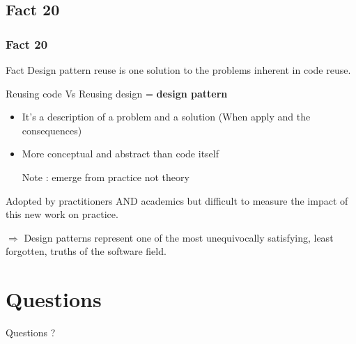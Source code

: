 \documentclass{beamer}
\begin{document}
\subsection{Fact 20}
\begin{frame}
    \frametitle{Fact 20}
    \begin{block}{Fact}
    Design pattern reuse is one solution to the problems inherent in code reuse.
    \end{block}

    Reusing code Vs Reusing design = \textbf{design pattern}

    \begin{itemize}
        \item It's a description of a problem and a solution
            (When apply and the consequences)
        \item More conceptual and abstract than code itself

        \item[Note]: emerge from practice not theory
    \end{itemize}

    Adopted by practitioners AND academics but difficult to measure the
    impact of this new work on practice.

    $\Rightarrow$  Design patterns represent one of the most unequivocally satisfying,
    least forgotten, truths of the software field.

\end{frame}

\section{Questions}

\begin{frame}[plain,c]

\begin{center}
\Huge Questions ?
\end{center}

\end{frame}
\end{document}
